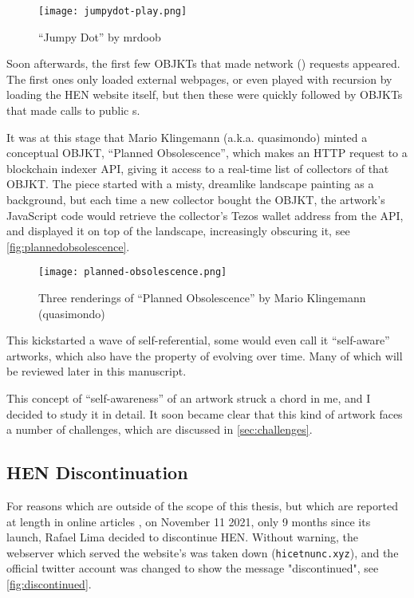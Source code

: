 \begin{figure}[H]
    \centering
    \texttt{[image: jumpydot-play.png]}
    \caption[``Jumpy Dot'' by mrdoob]{``Jumpy Dot'' by mrdoob}
    \label{fig:jumpydot}
\end{figure}


Soon afterwards, the first few OBJKTs that made network () requests appeared. The first ones only loaded external webpages, or even played with recursion by loading the HEN website itself, but then these were quickly followed by OBJKTs that made calls to public s.

It was at this stage that Mario Klingemann (a.k.a. quasimondo) minted a conceptual OBJKT, ``Planned Obsolescence'', which makes an HTTP request to a blockchain indexer API, giving it access to a real-time list of collectors of that OBJKT. The piece started with a misty, dreamlike landscape painting as a background, but each time a new collector bought the OBJKT, the artwork's JavaScript code would retrieve the collector's Tezos wallet address from the API, and displayed it on top of the landscape, increasingly obscuring it, see \autoref{fig:plannedobsolescence}.

\begin{figure}[H]
    \centering
    \texttt{[image: planned-obsolescence.png]}
    \caption[``Planned Obsolescence'' by quasimondo]{Three renderings of ``Planned Obsolescence'' by Mario Klingemann (quasimondo)}
    \label{fig:plannedobsolescence}
\end{figure}


This kickstarted a wave of self-referential, some would even call it ``self-aware'' artworks, which also have the property of evolving over time. Many of which will be reviewed later in this manuscript.

This concept of ``self-awareness'' of an artwork struck a chord in me, and I decided to study it in detail. It soon became clear that this kind of artwork faces a number of challenges, which are discussed in \autoref{sec:challenges}.


\subsection*{HEN Discontinuation}
\label{sub:teia}

For reasons which are outside of the scope of this thesis, but which are reported at length in online articles \cite{straeubigHENTimelineHentimeline2024} \cite{siqueiraHicNuncStory2021a} \cite{tezosHistoryTeiaArt2022} \cite{smithHicNuncPart2022}, on November 11 2021, only 9 months since its launch, Rafael Lima decided to discontinue HEN. Without warning, the webserver which served the website's  was taken down (\texttt{hicetnunc.xyz}), and the official twitter account was changed to show the message "discontinued", see \autoref{fig:discontinued}.

